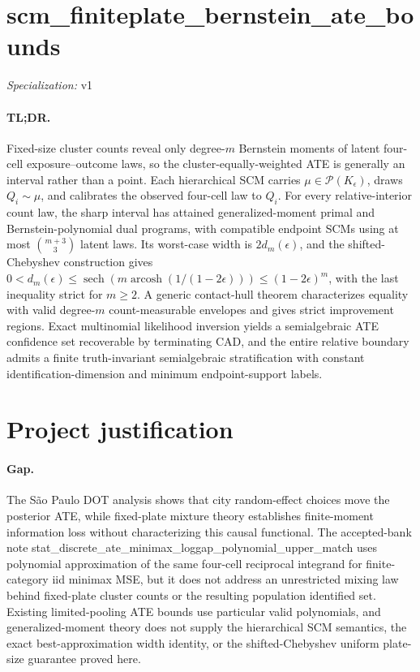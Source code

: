 \documentclass{article}
\begin{document}
\sloppy

\section*{scm\_\allowbreak{}finiteplate\_\allowbreak{}bernstein\_\allowbreak{}ate\_\allowbreak{}bounds}

\noindent\textit{Specialization:} v1\par

\paragraph{TL;DR.} Fixed-size cluster counts reveal only degree-\(m\) Bernstein moments of latent four-cell exposure--outcome laws, so the cluster-equally-weighted ATE is generally an interval rather than a point. Each hierarchical SCM carries \(\mu\in\mathcal P(K_{\epsilon})\), draws \(Q_i\sim\mu\), and calibrates the observed four-cell law to \(Q_i\). For every relative-interior count law, the sharp interval has attained generalized-moment primal and Bernstein-polynomial dual programs, with compatible endpoint SCMs using at most \({m+3\choose3}\) latent laws. Its worst-case width is \(2d_m(\epsilon)\), and the shifted-Chebyshev construction gives \(0<d_m(\epsilon)\leq\operatorname{sech}(m\operatorname{arcosh}(1/(1-2\epsilon)))\leq(1-2\epsilon)^m\), with the last inequality strict for \(m\geq2\). A generic contact-hull theorem characterizes equality with valid degree-\(m\) count-measurable envelopes and gives strict improvement regions. Exact multinomial likelihood inversion yields a semialgebraic ATE confidence set recoverable by terminating CAD, and the entire relative boundary admits a finite truth-invariant semialgebraic stratification with constant identification-dimension and minimum endpoint-support labels.

\section{Project justification}

\paragraph{Gap.} The São Paulo DOT analysis shows that city random-effect choices move the posterior ATE, while fixed-plate mixture theory establishes finite-moment information loss without characterizing this causal functional. The accepted-bank note stat\_discrete\_ate\_minimax\_loggap\_polynomial\_upper\_match uses polynomial approximation of the same four-cell reciprocal integrand for finite-category iid minimax MSE, but it does not address an unrestricted mixing law behind fixed-plate cluster counts or the resulting population identified set. Existing limited-pooling ATE bounds use particular valid polynomials, and generalized-moment theory does not supply the hierarchical SCM semantics, the exact best-approximation width identity, or the shifted-Chebyshev uniform plate-size guarantee proved here.
\end{document}
